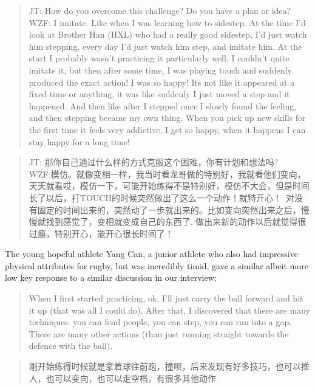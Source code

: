 \begin{CJK}{UTF8}{gbsn}
    \begin{quotation}
      JT: How do you overcome this challenge? Do you have a plan or idea? \\
      WZF: I imitate.  Like when I was learning how to sidestep. At the time I’d look at Brother Han (HXL) who had a really good sidestep, I'd just watch him stepping, every day I'd just watch him step, and imitate him.  At the start I probably wasn't practicing it particularly well, I couldn't quite imitate it, but then after some time, I was playing touch and suddenly produced the exact action! I was so happy! Its not like it appeared at a fixed time or anything, it was like suddenly I just moved a step and it happened. And then like after I stepped once I slowly found the feeling, and then stepping became my own thing.  When you pick up new skills for the first time it feels very addictive, I get so happy, when it happens I can stay happy for a long time!
    \end{quotation}

    \begin{quotation}
      JT: 那你自己通过什么样的方式克服这个困难，你有计划和想法吗? \\
      WZF:模仿。就像变相一样，我当时看龙哥做的特别好，我就看他们变向，天天就看哎，模仿一下，可能开始练得不是特别好，模仿不大会，但是时间长了以后，打TOUCH的时候突然做出了这么一个动作！就特开心！ 对没有固定的时间出来的，突然动了一步就出来的。比如变向突然出来之后，慢慢就找到感觉了，变相就变成自己的东西了. 做出来新的动作以后就觉得很过瘾，特别开心，能开心很长时间了！
    \end{quotation}

The young hopeful athlete Yang Can, a junior athlete who also had impressive physical attributes for rugby, but was incredibly timid, gave a similar albeit more low key response to a similar discussion in our interview:

    \begin{quotation}
      When I first started practicing, ok, I’ll just carry the ball forward and hit it up (that was all I could do). After that, I discovered that there are many techniques: you can fend people, you can step, you can run into a gap. There are many other actions (than just running straight towards the defence with the ball).
    \end{quotation}

    \begin{quotation}
      刚开始练得时候就是拿着球往前跑，撞呗，后来发现有好多技巧，也可以推人，也可以变向，也可以走空档，有很多其他动作 
    \end{quotation}


\end{CJK}
